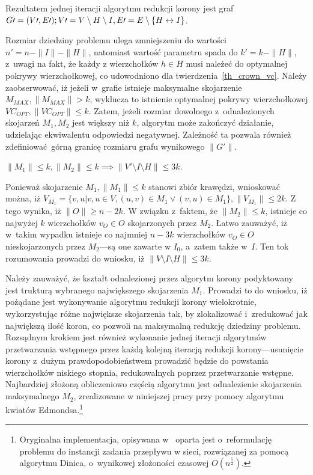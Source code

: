 \par{
  Rezultatem jednej iteracji algorytmu redukcji korony jest graf
  $G\prime=(V\prime, E\prime);\\V\prime=V\setminus H \setminus I, E\prime = E
  \setminus \{H\leftrightarrow I\}$.

  Rozmiar dziedziny problemu ulega zmniejszeniu do wartości
  $n\prime=n-\|I\|-\|H\|$, natomiast wartość parametru spada do $k\prime=k-\|H\|$,
  z~uwagi na fakt, że każdy z wierzchołków $h \in H$ musi należeć do optymalnej
  pokrywy wierzchołkowej, co udowodniono dla twierdzenia~\ref{th_crown_vc}.
  Należy zaobserwować, iż jeżeli w~grafie istnieje maksymalne skojarzenie
  $M_{MAX}, \|M_{MAX}\| > k$, wyklucza to istnienie optymalnej pokrywy
  wierzchołkowej $VC_{OPT}, \|VC_{OPT}\|\leq k$.
  Zatem, jeżeli rozmiar dowolnego z~odnalezionych skojarzeń $M_1, M_2$ jest
  większy niż $k$, algorytm może zakończyć działanie, udzielając ekwiwalentu 
  odpowiedzi negatywnej.
  Zależność ta pozwala również zdefiniować górną granicę rozmiaru grafu 
  wynikowego $\|G\prime\|$.
}
\begin{theorem}
  $\|M_1\| \leq k, \|M_2\| \leq k \implies \|V\prime \setminus I \setminus H\|
  \leq 3k$.
\end{theorem}
\begin{bproof}
  Ponieważ skojarzenie $M_1, \|M_1\| \leq k$ stanowi zbiór krawędzi, wnioskować
  można, iż $V_{M_1}=\{v, u|v, u \in V, (u,v)\in M_1 \lor (v,u) \in M_1\}, \|V_{M_1}\| \leq
  2k$.
  Z tego wynika, iż $\|O\| \geq n-2k$.
  W związku z~faktem, że $\|M_2\| \leq k$, istnieje co najwyżej $k$ wierzchołków
  $v_O \in O$ skojarzonych przez $M_2$.
  Łatwo zauważyć, iż w~takim wypadku istnieje co najmniej $n-3k$ wierzchołków
  $v_O \in O$ nieskojarzonych przez $M_2$---są one zawarte w $I_0$, a~zatem
  także w~$I$.
  Ten tok rozumowania prowadzi do wniosku, iż $\|V \setminus I \setminus H\|
  \leq 3k$.
\end{bproof}
\par{
  Należy zauważyć, że kształt odnalezionej przez algorytm korony podyktowany
  jest trukturą wybranego największego skojarzenia $M_1$.
  Prowadzi to do wniosku, iż pożądane jest wykonywanie algorytmu redukcji korony
  wielokrotnie, wykorzystując różne największe skojarzenia tak, by zlokalizować 
  i~zredukować jak największą ilość koron, co pozwoli na maksymalną redukcję
  dziedziny problemu.
  Rozsądnym krokiem jest również wykonanie jednej iteracji algorytmów 
  przetwarzania wstępnego przez każdą kolejną iteracją redukcji 
  korony---usunięcie korony z~dużym prawdopodobieństwem prowadzić będzie do 
  powstania wierzchołków niskiego stopnia, redukowalnych poprzez przetwarzanie
  wstępne.
  Najbardziej złożoną obliczeniowo częścią algorytmu jest odnalezienie
  skojarzenia maksymalnego $M_2$, zrealizowane w niniejszej pracy przy pomocy 
  algorytmu kwiatów Edmondsa.\footnote{
    Oryginalna implementacja, opisywana
    w~\cite{KernelizationAlgorithms04} oparta jest o~reformulację problemu do
    instancji zadania przepływu w sieci, rozwiązanej za pomocą algorytmu Dinica,
    o~wynikowej złożoności czasowej $O(n^{\frac{5}{2}})$.
  }
}

